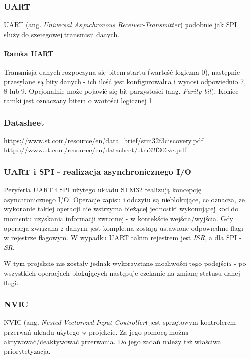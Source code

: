 \documentclass{article}
\begin{document}
\subsubsection{UART}
UART (ang. \emph{Universal Asynchronous Receiver-Transmitter}) podobnie jak SPI służy
do szeregowej transmisji danych.

\paragraph{Ramka UART}
Transmisja danych rozpoczyna się bitem startu (wartość logiczna 0), następnie przesyłane są
bity danych - ich ilość jest konfigurowalna i wynosi odpowiednio 7, 8 lub 9. Opcjonalnie
może pojawić się bit parzystości (ang. \emph{Parity bit}). Koniec ramki jest 
oznaczany bitem o wartości logicznej 1.

\subsubsection{Datasheet}
\url{https://www.st.com/resource/en/data_brief/stm32f3discovery.pdf}
\newline
\url{https://www.st.com/resource/en/datasheet/stm32f303vc.pdf}

\subsubsection{UART i SPI - realizacja asynchronicznego I/O}
Peryferia UART i SPI użytego układu STM32 realizują koncepcję
asynchronicznego I/O. Operacje zapisu i odczytu są nieblokujące, co oznacza, że
wykonanie takiej operacji nie wstrzyma bieżącej jednostki wykonującej kod do momentu
uzyskania informacji zwrotnej - w kontekście wejścia/wyjścia. Gdy operacja związana
z danymi jest kompletna zostają ustawione odpowiednie flagi w rejestrze flagowym.
W wypadku UART takim rejestrem jest \emph{ISR}, a dla SPI - \emph{SR}.

W tym projekcie nie zostały jednak wykorzystane możliwości tego podejścia - po wszystkich
operacjach blokujących następuje czekanie na zmianę statusu danej flagi.

\subsubsection{NVIC}
NVIC (ang. \emph{Nested Vectorized Input Controller}) jest sprzętowym kontrolerem
przerwań układu użytego w projekcie. Za jego pomocą można aktywować/deaktywować
przerwania. Do jego zadań należy też właściwa priorytetyzacja.
\end{document}
